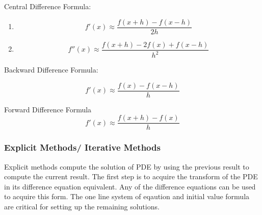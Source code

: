 Central Difference Formula:
\begin{enumerate}
\item \[f'(x) \approx \frac{f(x+h) - f(x-h)}{2h} \]
\item \[f''(x) \approx \frac {f(x+h) -2f(x)+ f(x-h)}{h^2}\]
\end{enumerate}

Backward Difference Formula: 

\[f'(x) \approx \frac{f(x) - f(x-h)}{h} \]

Forward Difference Formula
\[f'(x) \approx \frac{f(x+h) - f(x)}{h} \]


\subsubsection {Explicit Methods/ Iterative Methods}
Explicit methods compute the solution of PDE by using the previous result to compute the current result.  The first step is to  %
acquire %
the transform of the PDE %
in  its difference equation equivalent.   Any of the difference equations can be used to acquire this form.  %
The one line system of eqaution and initial value formula are critical for setting up the remaining solutions. %



